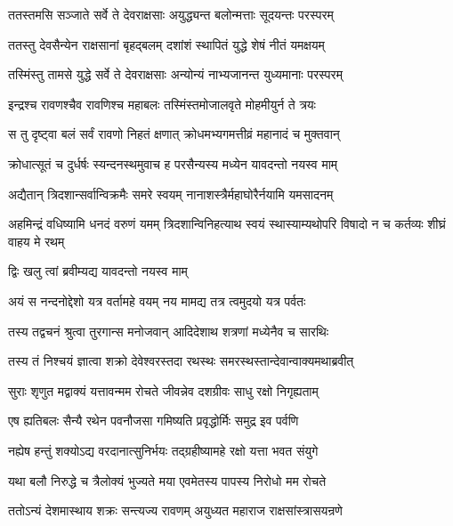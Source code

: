 
\twolineshloka
{ततस्तमसि सञ्जाते सर्वे ते देवराक्षसाः}
{अयुद्ध्यन्त बलोन्मत्ताः सूदयन्तः परस्परम्} %

\twolineshloka
{ततस्तु देवसैन्येन राक्षसानां बृहद्बलम्}
{दशांशं स्थापितं युद्धे शेषं नीतं यमक्षयम्} %

\twolineshloka
{तस्मिंस्तु तामसे युद्धे सर्वे ते देवराक्षसाः}
{अन्योन्यं नाभ्यजानन्त युध्यमानाः परस्परम्} %

\twolineshloka
{इन्द्रश्च रावणश्चैव रावणिश्च महाबलः}
{तस्मिंस्तमोजालवृते मोहमीयुर्न ते त्रयः} %

\twolineshloka
{स तु दृष्ट्वा बलं सर्वं रावणो निहतं क्षणात्}
{क्रोधमभ्यगमत्तीव्रं महानादं च मुक्तवान्} %

\twolineshloka
{क्रोधात्सूतं च दुर्धर्षः स्यन्दनस्थमुवाच ह}
{परसैन्यस्य मध्येन यावदन्तो नयस्व माम्} %

\twolineshloka
{अद्यैतान् त्रिदशान्सर्वान्विक्रमैः समरे स्वयम्}
{नानाशस्त्रैर्महाघोरैर्नयामि यमसादनम्} %

\threelineshloka
{अहमिन्द्रं वधिष्यामि धनदं वरुणं यमम्}
{त्रिदशान्विनिहत्याथ स्वयं स्थास्याम्यथोपरि}
{विषादो न च कर्तव्यः शीघ्रं वाहय मे रथम्} %

\onelineshloka
{द्विः खलु त्वां ब्रवीम्यद्य यावदन्तो नयस्व माम्} %

\twolineshloka
{अयं स नन्दनोद्देशो यत्र वर्तामहे वयम्}
{नय मामद्य तत्र त्वमुदयो यत्र पर्वतः} %

\twolineshloka
{तस्य तद्वचनं श्रुत्वा तुरगान्स मनोजवान्}
{आदिदेशाथ शत्रणां मध्येनैव च सारथिः} %

\twolineshloka
{तस्य तं निश्चयं ज्ञात्वा शक्रो देवेश्वरस्तदा}
{रथस्थः समरस्थस्तान्देवान्वाक्यमथाब्रवीत्} %

\twolineshloka
{सुराः शृणुत मद्वाक्यं यत्तावन्मम रोचते}
{जीवन्नेव दशग्रीवः साधु रक्षो निगृह्यताम्} %

\twolineshloka
{एष ह्यतिबलः सैन्यै रथेन पवनौजसा}
{गमिष्यति प्रवृद्धोर्मिः समुद्र इव पर्वणि} %

\twolineshloka
{नह्येष हन्तुं शक्योऽद्य वरदानात्सुनिर्भयः}
{तद्ग्रहीष्यामहे रक्षो यत्ता भवत संयुगे} %

\twolineshloka
{यथा बलौ निरुद्धे च त्रैलोक्यं भुज्यते मया}
{एवमेतस्य पापस्य निरोधो मम रोचते} %

\twolineshloka
{ततोऽन्यं देशमास्थाय शक्रः सन्त्यज्य रावणम्}
{अयुध्यत महाराज राक्षसांस्त्रासयन्रणे} %

